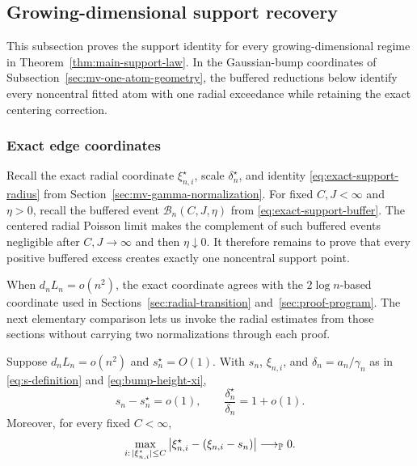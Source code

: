 \subsection{Growing-dimensional support recovery}

This subsection proves the support identity for every growing-dimensional
regime in Theorem~\ref{thm:main-support-law}. In the Gaussian-bump coordinates
of Subsection~\ref{sec:mv-one-atom-geometry}, the buffered reductions below
identify every noncentral fitted atom with one radial exceedance while
retaining the exact centering correction.

\subsubsection{Exact edge coordinates}

Recall the exact radial coordinate \(\xi_{n,i}^\star\), scale
\(\delta_n^\star\), and identity \eqref{eq:exact-support-radius} from
Section~\ref{sec:mv-gamma-normalization}.
For fixed \(C,J<\infty\) and \(\eta>0\), recall the buffered event
\(\mathcal B_n(C,J,\eta)\) from \eqref{eq:exact-support-buffer}.
The centered radial Poisson limit makes the complement of such buffered
events negligible after \(C,J\to\infty\) and then \(\eta\downarrow0\).
It therefore remains to prove that every positive buffered excess creates
exactly one noncentral support point.

When \(d_nL_n=o(n^2)\), the exact coordinate agrees with the
\(2\log n\)-based coordinate used in Sections~\ref{sec:radial-transition}
and~\ref{sec:proof-program}. The next
elementary comparison lets us invoke the radial estimates from those sections
without carrying two normalizations through each proof.

\begin{lemma}
\label{lem:exact-old-edge-coordinate}
Suppose \(d_nL_n=o(n^2)\) and \(s_n^\star=O(1)\).  With \(s_n\),
\(\xi_{n,i}\), and \(\delta_n=a_n/\gamma_n\) as in
\eqref{eq:s-definition} and \eqref{eq:bump-height-xi},
\[
 s_n-s_n^\star=o(1),
 \qquad
 \frac{\delta_n^\star}{\delta_n}=1+o(1).
\]
Moreover, for every fixed \(C<\infty\),
\begin{equation}
\label{eq:exact-old-edge-comparison}
 \max_{i:\,|\xi_{n,i}^\star|\le C}
 \left|\xi_{n,i}^\star-(\xi_{n,i}-s_n)\right|
 \longrightarrow_{\mathbb P}0.
\end{equation}
\end{lemma}

